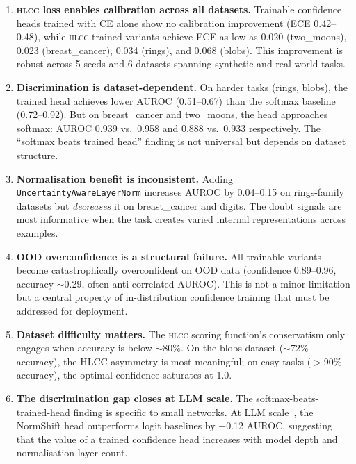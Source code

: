 \documentclass[11pt,a4paper]{article}
\newcommand{\hlcc}{\textsc{hlcc}}
\begin{document}
\begin{enumerate}
  \item \textbf{\hlcc{} loss enables calibration across all datasets.}
        Trainable confidence heads trained with CE alone show no
        calibration improvement (ECE 0.42--0.48), while
        \hlcc{}-trained variants achieve ECE as low as 0.020
        (two\_moons), 0.023 (breast\_cancer), 0.034 (rings), and
        0.068 (blobs).  This improvement is robust across 5 seeds
        and 6 datasets spanning synthetic and real-world tasks.
  \item \textbf{Discrimination is dataset-dependent.}
        On harder tasks (rings, blobs), the trained head achieves
        lower AUROC (0.51--0.67) than the softmax baseline
        (0.72--0.92).  But on breast\_cancer and two\_moons, the head
        approaches softmax: AUROC 0.939 vs.\ 0.958 and 0.888 vs.\
        0.933 respectively.  The ``softmax beats trained head''
        finding is not universal but depends on dataset structure.
  \item \textbf{Normalisation benefit is inconsistent.}  Adding
        \texttt{UncertaintyAwareLayerNorm} increases AUROC by
        0.04--0.15 on rings-family datasets but \emph{decreases}
        it on breast\_cancer and digits.  The doubt signals are most
        informative when the task creates varied internal
        representations across examples.
  \item \textbf{OOD overconfidence is a structural failure.}
        All trainable variants become catastrophically overconfident
        on OOD data (confidence 0.89--0.96, accuracy $\sim$0.29,
        often anti-correlated AUROC).  This is not a minor
        limitation but a central property of in-distribution
        confidence training that must be addressed for deployment.
  \item \textbf{Dataset difficulty matters.}  The \hlcc{} scoring
        function's conservatism only engages when accuracy is below
        $\sim$80\%.  On the blobs dataset ($\sim$72\% accuracy),
        the HLCC asymmetry is most meaningful; on easy tasks
        ($>$90\% accuracy), the optimal confidence saturates at 1.0.
  \item \textbf{The discrimination gap closes at LLM scale.}  The
        softmax-beats-trained-head finding is specific to small
        networks.  At LLM scale~\cite{mccallum2026hlcc}, the
        NormShift head outperforms logit baselines by +0.12 AUROC,
        suggesting that the value of a trained confidence head
        increases with model depth and normalisation layer count.
\end{enumerate}
\end{document}
